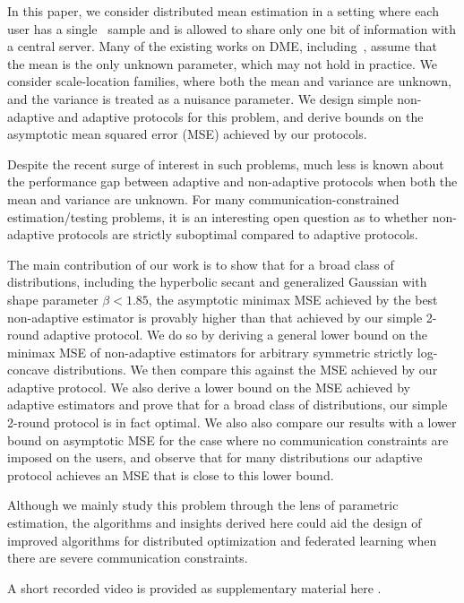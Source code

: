 \documentclass[10pt]{article} %
\newcommand{\iid}{\text{i.i.d.}}
\theoremstyle{plain}
\theoremstyle{definition}
\theoremstyle{remark}
\begin{document}
\par In this paper, we consider distributed mean estimation in a setting where each user has a single \iid\ sample and is allowed to share only one bit of information with a central server. Many of the existing works on DME, including~\citep{kipnis2022mean,cai2024distributed,ritesh}, assume that the mean is the only unknown parameter, which may not hold in practice. We consider scale-location families, where both the mean and variance are unknown, and the variance is treated as a nuisance parameter. We design simple non-adaptive and adaptive protocols for this problem, and derive bounds on the asymptotic mean squared error (MSE) achieved by our protocols. 
\par Despite the recent surge of interest in such problems, much less is known about the performance gap between adaptive and non-adaptive protocols when both the mean and variance are unknown. 
For many communication-constrained estimation/testing problems, it is an interesting open question as to whether non-adaptive protocols are strictly suboptimal compared to adaptive protocols. 
\par The main contribution of our work is to show that for a broad class of distributions, including the hyperbolic secant and generalized Gaussian with shape parameter $\beta < 1.85$, the asymptotic minimax MSE achieved by the best non-adaptive estimator is provably higher than that achieved by our simple 2-round adaptive protocol.
We do so by deriving a general lower bound on the minimax MSE of non-adaptive estimators for arbitrary symmetric strictly log-concave distributions. We then compare this against the MSE achieved by our adaptive protocol. We also derive a lower bound on the MSE achieved by adaptive estimators and prove that for a broad class of distributions, our simple 2-round protocol is in fact optimal. We also also compare our results with a lower bound on asymptotic MSE for the case where no communication constraints are imposed on the users, and observe that for many distributions our adaptive protocol achieves an MSE that is close to this lower bound.
\par Although we mainly study this problem through the lens of parametric estimation, the algorithms and insights derived here could aid the design of improved algorithms for distributed optimization and federated learning when there are severe communication constraints.

A short recorded video is provided as supplementary material here \cite{PPT_Video}.
\end{document}
